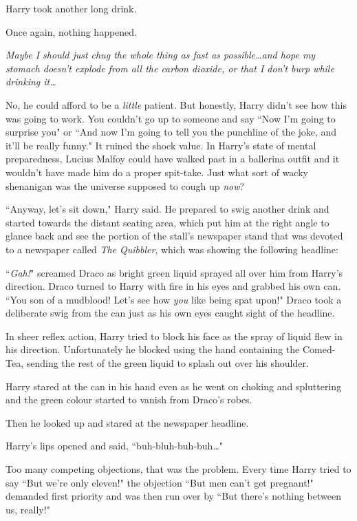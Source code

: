 Harry took another long drink.

Once again, nothing happened.

\emph{Maybe I should just chug the whole thing as fast as possible…and hope my stomach doesn't explode from all the carbon dioxide, or that I don't burp while drinking it…}

No, he could afford to be a \emph{little} patient. But honestly, Harry didn't see how this was going to work. You couldn't go up to someone and say ``Now I'm going to surprise you" or ``And now I'm going to tell you the punchline of the joke, and it'll be really funny." It ruined the shock value. In Harry's state of mental preparedness, Lucius Malfoy could have walked past in a ballerina outfit and it wouldn't have made him do a proper spit-take. Just what sort of wacky shenanigan was the universe supposed to cough up \emph{now}?

``Anyway, let's sit down," Harry said. He prepared to swig another drink and started towards the distant seating area, which put him at the right angle to glance back and see the portion of the stall's newspaper stand that was devoted to a newspaper called \emph{The Quibbler}, which was showing the following headline:


``\emph{Gah!}" screamed Draco as bright green liquid sprayed all over him from Harry's direction. Draco turned to Harry with fire in his eyes and grabbed his own can. ``You son of a mudblood! Let's see how \emph{you} like being spat upon!" Draco took a deliberate swig from the can just as his own eyes caught sight of the headline.

In sheer reflex action, Harry tried to block his face as the spray of liquid flew in his direction. Unfortunately he blocked using the hand containing the Comed-Tea, sending the rest of the green liquid to splash out over his shoulder.

Harry stared at the can in his hand even as he went on choking and spluttering and the green colour started to vanish from Draco's robes.

Then he looked up and stared at the newspaper headline.


Harry's lips opened and said, ``buh-bluh-buh-buh…"

Too many competing objections, that was the problem. Every time Harry tried to say ``But we're only eleven!" the objection ``But men can't get pregnant!" demanded first priority and was then run over by ``But there's nothing between us, really!"

